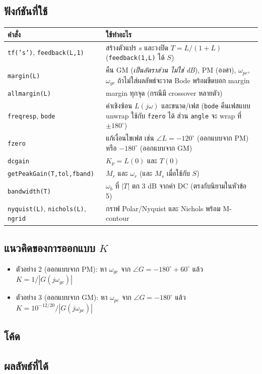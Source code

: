 \documentclass[12pt,a4paper]{article}
\newcommand{\jw}{j\omega}
\begin{document}
\subsection{ฟังก์ชันที่ใช้}
\begin{center}
\small
\renewcommand{\arraystretch}{1.25}
\begin{tabular}{@{}>{\raggedright}p{4.6cm}>{\raggedright\arraybackslash}p{11cm}@{}}
\toprule
คำสั่ง & ใช้ทำอะไร \\
\midrule
\texttt{tf('s')}, \texttt{feedback(L,1)} & สร้างตัวแปร $s$ และวงปิด $T=L/(1+L)$ (\texttt{feedback(1,L)} ได้ $S$) \\
\texttt{margin(L)} & คืน GM (\emph{เป็นอัตราส่วน ไม่ใช่ dB}), PM (องศา), $\omega_{pc}$, $\omega_{gc}$ ถ้าไม่ใส่ผลลัพธ์จะวาด Bode พร้อมขีดบอก margin \\
\texttt{allmargin(L)} & margin ทุกจุด (กรณีมี crossover หลายตัว) \\
\texttt{freqresp}, \texttt{bode} & ค่าเชิงซ้อน $L(\jw)$ และขนาด/เฟส (\texttt{bode} คืนเฟสแบบ unwrap ใช้กับ \texttt{fzero} ได้ ส่วน \texttt{angle} จะ wrap ที่ $\pm180^\circ$) \\
\texttt{fzero} & แก้เงื่อนไขเฟส เช่น $\angle L=-120^\circ$ (ออกแบบจาก PM) หรือ $-180^\circ$ (ออกแบบจาก GM) \\
\texttt{dcgain} & $K_p=L(0)$ และ $T(0)$ \\
\texttt{getPeakGain(T,tol,fband)} & $M_r$ และ $\omega_r$ (และ $M_s$ เมื่อใช้กับ $S$) \\
\texttt{bandwidth(T)} & $\omega_b$ ที่ $|T|$ ตก $3$ dB จากค่า DC (ตรงกับนิยามในหัวข้อ 5) \\
\texttt{nyquist(L)}, \texttt{nichols(L)}, \texttt{ngrid} & กราฟ Polar/Nyquist และ Nichols พร้อม M-contour \\
\bottomrule
\end{tabular}
\end{center}

\subsection{แนวคิดของการออกแบบ $K$}
\begin{itemize}[leftmargin=1.2em,itemsep=2pt]
\item ตัวอย่าง 2 (ออกแบบจาก PM): หา $\omega_{gc}$ จาก $\angle G=-180^\circ+60^\circ$ แล้ว $K=1/|G(j\omega_{gc})|$
\item ตัวอย่าง 3 (ออกแบบจาก GM): หา $\omega_{pc}$ จาก $\angle G=-180^\circ$ แล้ว $K=10^{-12/20}/|G(j\omega_{pc})|$
\end{itemize}

\subsection{โค้ด}
{\scriptsize

}

\subsection{ผลลัพธ์ที่ได้}
{\scriptsize

}
\end{document}
